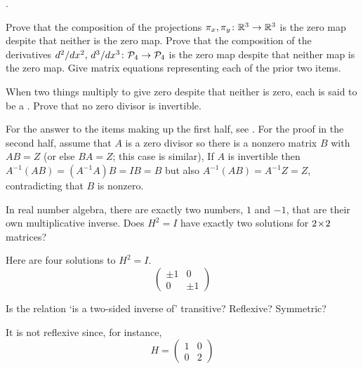 \begin{exercises}
{    .}
    \begin{exparts}
      \partsitem Prove that the composition of the projections
        \( \mbox{$\pi_x,\pi_y\colon \mathbb{R}^3\to \mathbb{R}^3$} \) is the zero map despite that
        neither is the zero map.
      \partsitem Prove that the composition of the derivatives
        \( \mbox{$d^2/dx^2,\,d^3/dx^3\colon \mathcal{P}_4\to \mathcal{P}_4$} \)
        is the zero map despite that neither map is the zero map.
      \partsitem Give matrix equations representing each of the prior two
        items.
    \end{exparts}
    When two things multiply to give zero despite that neither is zero, each is
    said to be a .
    Prove that no zero divisor is invertible.
    \begin{answer}
      For the answer to the items making up the first half, see 
      .
      For the proof in the second half, assume that $A$ is a zero divisor so
      there is a nonzero matrix $B$ with $AB=Z$ 
      (or else $BA=Z$; this case is similar), 
      If $A$ is invertible
      then $A^{-1}(AB)=(A^{-1}A)B=IB=B$ but also
      $A^{-1}(AB)=A^{-1}Z=Z$, contradicting that $B$ is nonzero.
    \end{answer}
  \item 
    In real number algebra, there are exactly two numbers, $1$ and $-1$, 
    that are their own multiplicative inverse.
    Does \( H^2=I \) have exactly two solutions for \( 2 \! \times \! 2 \)
    matrices?
    \begin{answer}
      Here are four solutions to \( H^2=I \).
      \begin{equation*}
        \begin{pmatrix}
          \pm 1  &0  \\
          0      &\pm 1
        \end{pmatrix}
      \end{equation*}   
    \end{answer}
  \item 
   Is the relation `is a two-sided inverse of' transitive?
   Reflexive?
   Symmetric?
   \begin{answer}
     It is not reflexive since, for instance, 
     \begin{equation*}
       H=\begin{pmatrix}
         1  &0  \\
         0  &2
       \end{pmatrix}
     \end{equation*}

\end{answer}
\end{exercises}

